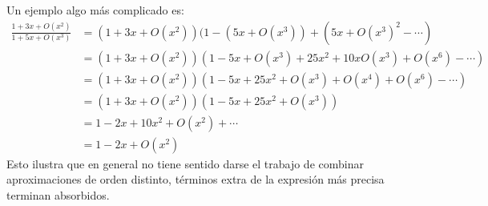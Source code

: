 \documentclass[spanish, fleqn]{article}
\begin{document}
  Un ejemplo algo más complicado es:
  \begin{align*}
    \frac{1 + 3 x + O(x^2)}{1 + 5 x + O(x^3)}
       &= (1 + 3 x + O(x^2))
            (1 - (5 x + O(x^3)) + (5 x + O(x^3)^2 - \dotsm) \\
       &= (1 + 3 x + O(x^2))
             (1 - 5 x + O(x^3) + 25 x^2 + 10 x O(x^3) + O(x^6) - \dotsm) \\
       &= (1 + 3 x + O(x^2))
             (1 - 5 x + 25 x^2 + O(x^3) + O(x^4) + O(x^6) - \dotsm) \\
       &= (1 + 3 x + O(x^2))
             (1 - 5 x + 25 x^2 + O(x^3)) \\
       &= 1 - 2 x + 10 x^2 + O(x^2) + \dotsm \\
       &= 1 - 2 x + O(x^2)
  \end{align*}
  Esto ilustra que en general no tiene sentido
  darse el trabajo de combinar aproximaciones de orden distinto,
  términos extra de la expresión más precisa terminan absorbidos.
\end{document}
